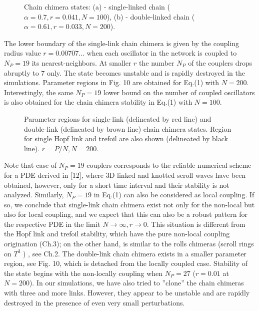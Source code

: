 \documentclass[epjST]{svjour}
\begin{document}
\begin{figure}[ht!]
  \caption{Chain chimera states: (a) -  single-linked chain ($\alpha=0.7, r=0.041, N=100$), (b) - double-linked chain ($\alpha=0.61, r=0.033, N=200$).}
  \label{fig:9} 
\end{figure}

The lower boundary of the single-link chain chimera is given by the coupling radius value  $r=0.00707...$ when each oscillator in the network is coupled to $N_P=19$ its nearest-neighbors. At smaller $r$ the number $N_P$ of the couplers drops abruptly to $7$ only. The state becomes unstable and is rapidly destroyed in the simulations.  Parameter regions in Fig. 10 are obtained for Eq.(1) with $N=200$.  Interestingly,  the same $N_P=19$ lower bound on the number of coupled oscillators is also obtained for the chain chimera stability in Eq.(1) with  $N= 100$.  


\begin{figure}[h]\sidecaption
{}
\caption{Parameter regions for single-link (delineated by red line) and double-link (delineated by brown line) chain chimera states. Region for  single Hopf link and trefoil are also shown (delineated by black line).
$r =P/N, N=200$. }
\label{fig:10}
\end{figure}

Note that case of $N_P=19$ couplers corresponds to the reliable numerical scheme for a PDE derived in [12], where 3D linked and knotted scroll waves have been obtained, however, only for a short time interval and their stability is not analyzed.  Similarly, $N_P=19$ in Eq.(1) can also be considered as local coupling.  If so, we conclude that single-link chain chimera exist not only for the non-local but also for local coupling, and we expect that this can also be a robust pattern  for the respective PDE in the limit $N\rightarrow\infty, r\rightarrow 0$.  This situation is different from the Hopf link and trefoil stability, which have the pure non-local coupling origination (Ch.3); on the other hand, is similar to the rolls chimeras (scroll rings on $T^3$ ) , see Ch.2.
The double-link chain chimera exists in a smaller parameter region, see Fig. 10, which is detached from the locally coupled case.  Stability of the state begins with the non-locally coupling when $N_P=27$ ($r=0.01$ at $N=200$).  In our simulations, we have also tried to ''clone'' the chain chimeras  with three and more links. However, they appear to be unstable and are rapidly destroyed in the presence of even very small perturbations.   
\end{document}
